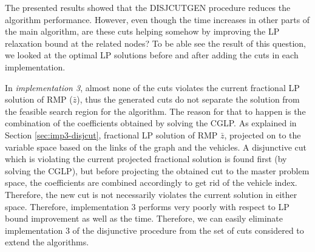 The presented results showed that the DISJCUTGEN procedure reduces the algorithm
performance. However, even though the time increases in other parts of the main
algorithm, are these cuts helping somehow by improving the LP relaxation
bound at the related nodes? To be able see the result of this question, we
looked at the optimal LP solutions before and after adding the cuts in each
implementation. 

In {\em implementation 3}, almost none of the cuts violates the current
fractional LP solution of RMP ($\bar{z}$), thus the generated cuts
do not separate the solution from the feasible search region for the algorithm.
The reason for that to happen is the combination of the coefficients
obtained by solving the CGLP. As explained in Section \ref{sec:imp3-disjcut},
fractional LP solution of RMP $\bar{z}$, projected on to the variable space
based on the links of the graph and the vehicles. A disjunctive cut which is
violating the current projected fractional solution is found first (by solving
the CGLP), but before projecting the obtained cut to the master problem
space, the coefficients are combined accordingly to get rid of the vehicle
index. Therefore, the new cut is not necessarily violates the
current solution in either space. Therefore, implementation 3 performs very
poorly with respect to LP bound improvement as well as the time. Therefore,
we can easily eliminate implementation 3 of the disjunctive procedure
from the set of cuts considered to extend the algorithms.

